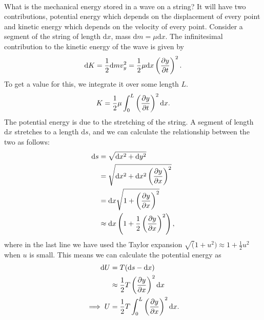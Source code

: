 \documentclass[../classical_mechanics.tex]{subfiles}
\begin{document}
        \paragraph{}
        What is the mechanical energy stored in a wave on a string?
        It will have two contributions, potential energy which depends on the displacement of every point and kinetic energy which depends on the velocity of every point.
        Consider a segment of the string of length $\mathrm{d}x$, mass $\mathrm{d}m=\mu\mathrm{d}x$.
        The infinitesimal contribution to the kinetic energy of the wave is given by
        \begin{equation}
            \mathrm{d}K=\frac{1}{2}\mathrm{d}mv_y^2=\frac{1}{2}\mu\mathrm{d}x\left(\pdv{y}{t}\right)^2.
        \end{equation}
        To get a value for this, we integrate it over some length $L$.
        \begin{equation}
            K=\frac{1}{2}\mu\int_{0}^{L}\left(\pdv{y}{t}\right)^2\mathrm{d}x.
        \end{equation}
        The potential energy is due to the stretching of the string.
        A segment of length $\mathrm{d}x$ stretches to a length $\mathrm{d}s$, and we can calculate the relationship between the two as follows:
        \begin{align}
            \mathrm{d}s&=\sqrt{\mathrm{d}x^2+\mathrm{d}y^2}\\
            &=\sqrt{\mathrm{d}x^2+\mathrm{d}x^2\left(\pdv{y}{x}\right)^2}\\
            &=\mathrm{d}x\sqrt{1+\left(\pdv{y}{x}\right)^2}\\
            &\approx\mathrm{d}x\left(1+\frac{1}{2}\left(\pdv{y}{x}\right)^2\right),
        \end{align}
        where in the last line we have used the Taylor expansion $\sqrt(1+u^2)\approx 1+\frac{1}{2}u^2$ when $u$ is small.
        This means we can calculate the potential energy as
        \begin{align}
            \mathrm{d}U&=T(\mathrm{d}s-\mathrm{d}x)\\
            &\approx\frac{1}{2}T\left(\pdv{y}{x}\right)^2\mathrm{d}x\\
            \implies U&=\frac{1}{2}T\int_{0}^{L}\left(\pdv{y}{x}\right)^2\mathrm{d}x.
        \end{align}
\end{document}
